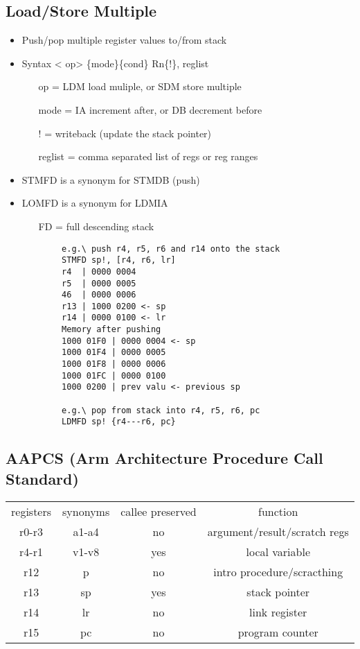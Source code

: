   \subsection{Load/Store Multiple}
    \begin{itemize}
      \item Push/pop multiple register values to/from stack
      \item Syntax \textless{} op\textgreater{} \{mode\}\{cond\} Rn\{!\},
      reglist
      \begin{itemize}
        \item[op] = LDM load muliple, or SDM store multiple
        \item[mode] = IA increment after, or DB decrement before
        \item[!] = writeback (update the stack pointer)
        \item[reglist] = comma separated list of regs or reg ranges
      \end{itemize}
      \item STMFD is a synonym for STMDB (push)
      \item LOMFD is a synonym for LDMIA
      \begin{itemize}
        \item[FD] = full descending stack
      \end{itemize}
      \begin{lstlisting}
        e.g.\ push r4, r5, r6 and r14 onto the stack
        STMFD sp!, [r4, r6, lr]
        r4  | 0000 0004
        r5  | 0000 0005
        46  | 0000 0006
        r13 | 1000 0200 <- sp
        r14 | 0000 0100 <- lr
        Memory after pushing
        1000 01F0 | 0000 0004 <- sp
        1000 01F4 | 0000 0005
        1000 01F8 | 0000 0006
        1000 01FC | 0000 0100
        1000 0200 | prev valu <- previous sp

        e.g.\ pop from stack into r4, r5, r6, pc
        LDMFD sp! {r4---r6, pc}
      \end{lstlisting}
    \end{itemize}

  \subsection{AAPCS (Arm Architecture Procedure Call Standard)}
    \begin{tabular}{c c c c}
      registers & synonyms & callee preserved & function\\
      r0-r3 & a1-a4   &   no  & argument/result/scratch regs\\
      r4-r1 & v1-v8   &   yes & local variable\\
      r12   & p       &   no  & intro procedure/scracthing\\
      r13   & sp      &   yes & stack pointer\\
      r14   & lr      &   no  & link register\\
      r15   & pc      &   no  & program counter
    \end{tabular}
